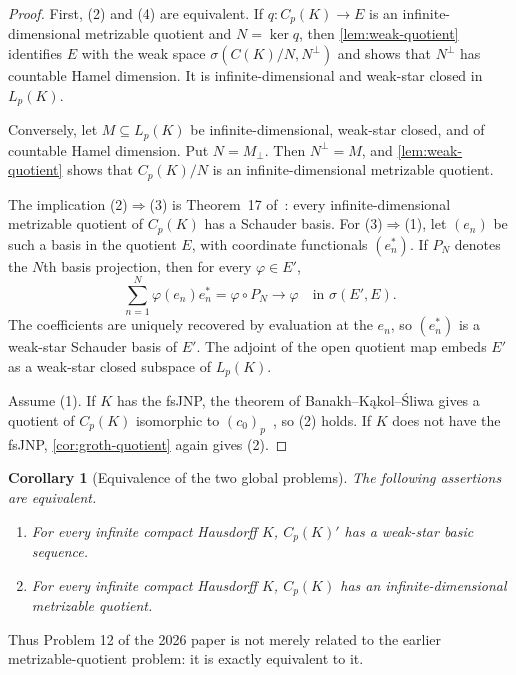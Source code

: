 \documentclass[11pt]{article}
\newtheorem{corollary}[theorem]{Corollary}
\newcommand{\Cp}{C_p}
\newcommand{\Lp}{L_p}
\newcommand{\czerop}{(c_0)_p}
\begin{document}
\begin{proof}
First, \textup{(2)} and \textup{(4)} are equivalent.  If
$q:\Cp(K)\to E$ is an infinite-dimensional metrizable quotient and
$N=\ker q$, then \cref{lem:weak-quotient} identifies $E$ with the weak space
$\sigma(C(K)/N,N^\perp)$ and shows that $N^\perp$ has countable Hamel
dimension.  It is infinite-dimensional and weak-star closed in $\Lp(K)$.

Conversely, let $M\subseteq\Lp(K)$ be infinite-dimensional, weak-star closed,
and of countable Hamel dimension.  Put $N=M_\perp$.  Then $N^\perp=M$, and
\cref{lem:weak-quotient} shows that $\Cp(K)/N$ is an infinite-dimensional
metrizable quotient.

The implication \textup{(2)}$\Rightarrow$\textup{(3)} is
Theorem~17 of~\cite{KLS2026}: every infinite-dimensional metrizable quotient
of $\Cp(K)$ has a Schauder basis.  For
\textup{(3)}$\Rightarrow$\textup{(1)}, let $(e_n)$ be such a basis in the
quotient $E$, with coordinate functionals $(e_n^*)$.  If $P_N$ denotes the
$N$th basis projection, then for every $\varphi\in E'$,
\[
 \sum_{n=1}^N \varphi(e_n)e_n^*=\varphi\circ P_N
 \longrightarrow\varphi
 \quad\text{in }\sigma(E',E).
\]
The coefficients are uniquely recovered by evaluation at the $e_n$, so
$(e_n^*)$ is a weak-star Schauder basis of $E'$.  The adjoint of the open
quotient map embeds $E'$ as a weak-star closed subspace of $\Lp(K)$.

Assume \textup{(1)}.  If $K$ has the fsJNP, the theorem of
Banakh--K\k{a}kol--\'Sliwa gives a quotient of $\Cp(K)$ isomorphic to
$\czerop$~\cite[Theorem~1]{BKS2019JNP}, so \textup{(2)} holds.  If $K$
does not have the fsJNP, \cref{cor:groth-quotient} again gives
\textup{(2)}.
\end{proof}

\begin{corollary}[Equivalence of the two global problems]\label{cor:global}
The following assertions are equivalent.
\begin{enumerate}[label=\textup{(\alph*)}]
\item For every infinite compact Hausdorff $K$, $\Cp(K)'$ has a weak-star basic
      sequence.
\item For every infinite compact Hausdorff $K$, $\Cp(K)$ has an
      infinite-dimensional metrizable quotient.
\end{enumerate}
\end{corollary}

Thus Problem 12 of the 2026 paper is not merely related to the earlier
metrizable-quotient problem: it is exactly equivalent to it.
\end{document}
